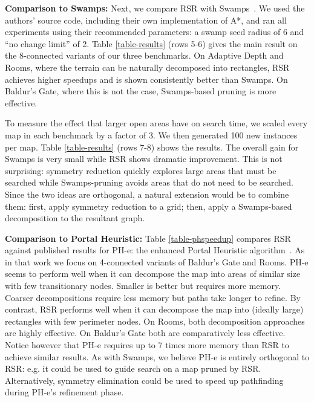 \par
\textbf{Comparison to Swamps:}
Next, we compare RSR with Swamps~\cite{pochter10}.  
We used the authors' source code, including their own implementation of A*, and 
ran all experiments using their recommended parameters: a swamp seed radius of 6 
and ``no change limit'' of 2. Table \ref{table-results} (rows 5-6) gives the main
result on the 8-connected variants of our three benchmarks.
On Adaptive Depth and Rooms, where the terrain can be naturally decomposed into
rectangles, RSR achieves higher speedups and is shown consistently better than Swamps. 
On Baldur's Gate, where this is not the case, Swamps-based pruning is more
effective. 
\par
To measure the effect that larger open areas have on search time, we scaled
every map in each benchmark by a factor of 3. We then generated 100
new instances per map. Table \ref{table-results} (rows 7-8) shows the results.  
The overall gain for Swamps is very small while RSR shows dramatic improvement.
This is not surprising: symmetry reduction quickly explores large
areas that must be searched while Swamps-pruning avoids areas
that do not need to be searched.
Since the two ideas are orthogonal, a natural extension would be to combine them: 
first, apply symmetry reduction to a grid; then, apply a Swamps-based 
decomposition to the resultant graph.


\textbf{Comparison to Portal Heuristic:}
Table \ref{table-phspeedup} compares RSR against published results for PH-e: the enhanced 
Portal Heuristic algorithm~\cite{goldenberg10}.  As in that work we focus
on 4-connected variants of Baldur's Gate and Rooms.
PH-e seems to perform well when it can decompose the map into areas of similar 
size with few transitionary nodes. Smaller is better but requires
more memory. Coarser decompositions require less memory but paths take longer
to refine. 
By contrast, RSR performs well when it can decompose the map into (ideally large) 
rectangles with few perimeter nodes.
On Rooms, both decomposition approaches are highly effective. 
On Baldur's Gate both are comparatively less effective.
Notice however that PH-e requires up to 7 times more memory than RSR to achieve
similar results.
As with Swamps, we believe PH-e is entirely orthogonal to RSR: e.g.
it could be used to guide search on a map pruned by RSR. Alternatively, 
symmetry elimination could be used to speed up pathfinding during PH-e's refinement phase.



